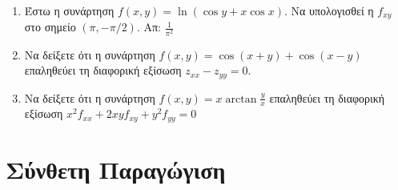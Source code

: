 \begin{enumerate}
  \item Έστω η συνάρτηση $f(x,y)=\ln\left(\cos y+x\cos x\right)$.  Να υπολογισθεί 
    η $ f_{xy} $ στο σημείο $(\pi,-\pi/2)$.  \hfill Απ: $\frac{1}{\pi^2}$



  \item Να δείξετε ότι η συνάρτηση $ f(x,y) = \cos{(x+y)} + \cos{(x-y)} $ 
    επαληθεύει τη διαφορική εξίσωση $ z_{xx} - z_{yy} = 0 $.

  \item Να δείξετε ότι η συνάρτηση $ f(x,y) = x \arctan{\frac{y}{x}} $ 
    επαληθεύει τη διαφορική εξίσωση $ x^{2} f_{xx} + 2xyf_{xy} + y^{2} f_{yy} = 0 $ 
\end{enumerate}


\section*{Σύνθετη Παραγώγιση}

